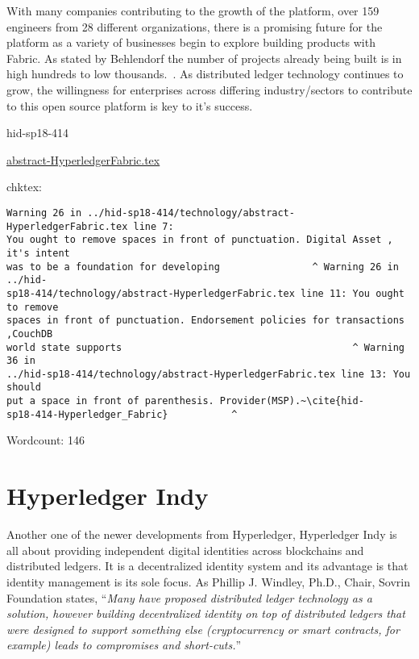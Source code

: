 With many companies contributing to the growth of the platform, over
159 engineers from 28 different organizations, there is a promising future for the platform as a
variety of businesses begin to explore building products with
Fabric. As stated by Behlendorf the number of projects already being
built is in high hundreds to low thousands.~\cite{hid-sp18-414-Behlendorf_Interview}. 
As distributed ledger technology continues to grow, the
willingness for enterprises across differing industry/sectors to
contribute to this open source platform is key to it's success.



\begin{IU}

hid-sp18-414

\href{https://github.com/cloudmesh-community/hid-sp18-414/blob/master//technology/abstract-HyperledgerFabric.tex}{abstract-HyperledgerFabric.tex}

 
chktex:
\begin{tiny}
\begin{verbatim}
Warning 26 in ../hid-sp18-414/technology/abstract-HyperledgerFabric.tex line 7:
You ought to remove spaces in front of punctuation. Digital Asset , it's intent
was to be a foundation for developing                ^ Warning 26 in ../hid-
sp18-414/technology/abstract-HyperledgerFabric.tex line 11: You ought to remove
spaces in front of punctuation. Endorsement policies for transactions ,CouchDB
world state supports                                        ^ Warning 36 in
../hid-sp18-414/technology/abstract-HyperledgerFabric.tex line 13: You should
put a space in front of parenthesis. Provider(MSP).~\cite{hid-
sp18-414-Hyperledger_Fabric}           ^
\end{verbatim}
\end{tiny}

Wordcount: 146

\end{IU}

\section{Hyperledger Indy}


Another one of the newer developments from Hyperledger, Hyperledger Indy 
is all about providing independent digital identities across blockchains 
and distributed ledgers. It is a decentralized identity system and its 
advantage is that identity management is its sole focus. 
As Phillip J. Windley, Ph.D., Chair, Sovrin Foundation states,  
\color{blue}``\emph{Many have proposed distributed ledger technology as a solution, 
however building decentralized identity on top of distributed ledgers 
that were designed to support something else (cryptocurrency or smart contracts, 
for example) leads to compromises and short-cuts.}''\color{black}~\cite{hid-sp18-414-Windley}

